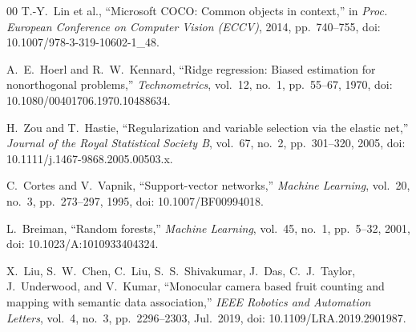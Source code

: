 \documentclass[conference,a4paper]{IEEEtran}
\begin{document}
\begin{thebibliography}{00}
T.-Y.~Lin et al.,
``Microsoft COCO: Common objects in context,''
in \textit{Proc. European Conference on Computer Vision (ECCV)}, 2014,
pp.~740--755, doi: 10.1007/978-3-319-10602-1\_48.

A.~E.~Hoerl and R.~W.~Kennard,
``Ridge regression: Biased estimation for nonorthogonal problems,''
\textit{Technometrics}, vol.~12, no.~1, pp.~55--67, 1970,
doi: 10.1080/00401706.1970.10488634.

H.~Zou and T.~Hastie,
``Regularization and variable selection via the elastic net,''
\textit{Journal of the Royal Statistical Society B}, vol.~67, no.~2,
pp.~301--320, 2005, doi: 10.1111/j.1467-9868.2005.00503.x.

C.~Cortes and V.~Vapnik,
``Support-vector networks,''
\textit{Machine Learning}, vol.~20, no.~3, pp.~273--297, 1995,
doi: 10.1007/BF00994018.

L.~Breiman,
``Random forests,''
\textit{Machine Learning}, vol.~45, no.~1, pp.~5--32, 2001,
doi: 10.1023/A:1010933404324.

X.~Liu, S.~W.~Chen, C.~Liu, S.~S.~Shivakumar, J.~Das, C.~J.~Taylor,
J.~Underwood, and V.~Kumar,
``Monocular camera based fruit counting and mapping with semantic data
association,''
\textit{IEEE Robotics and Automation Letters}, vol.~4, no.~3, pp.~2296--2303,
Jul.~2019, doi: 10.1109/LRA.2019.2901987.

\end{thebibliography}
\end{document}
